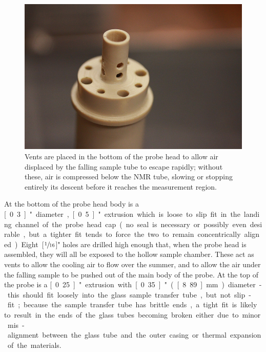 \documentclass[PaulGanssle-Thesis.tex]{subfiles}
\begin{document}
\begin{figure}
\centering
\vspace*{-0.5\lineheight}
\includegraphics[width=0.35\tw]{figures/magnetometer/NewProbeHeadBottomVentsSmaller.png}
\caption{Vents are placed in the bottom of the probe head to allow air displaced by the falling sample tube to escape rapidly; without these, air is compressed below the NMR tube, slowing or stopping entirely its descent before it reaches the measurement region.}
\label{fig:ProbeHeadVents}
\vspace*{-0.5\lineheight}
\end{figure}

At the bottom of the probe head body is a \unit[0.3]{"} diameter, \unit[0.5]{"} extrusion which is loose to slip fit in the landing channel of the probe head cap (no seal is necessary or possibly even desirable, but a tighter fit tends to force the two to remain concentrically aligned). Eight \unit[$\sfrac{1}{16}$]{"} holes are drilled high enough that, when the probe head is assembled, they will all be exposed to the hollow sample chamber. These act as vents to allow the cooling air to flow over the summer, and to allow the air under the falling sample to be pushed out of the main body of the probe. At the top of the probe is a \unit[0.25]{"} extrusion with \unit[0.35]{"} (\unit[8.89]{mm}) diameter - this should fit loosely into the glass sample transfer tube, but not slip-fit; because the sample transfer tube has brittle ends, a tight fit is likely to result in the ends of the glass tubes becoming broken either due to minor mis-alignment between the glass tube and the outer casing or thermal expansion of the materials.
\end{document}
